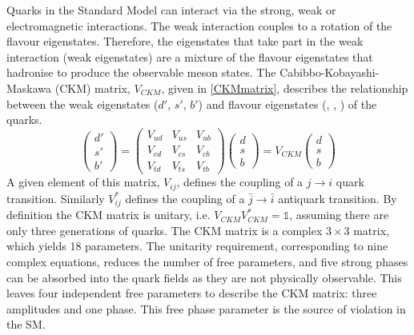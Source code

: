 Quarks in the Standard Model can interact via the strong, weak or electromagnetic interactions. The weak interaction couples to a rotation of the flavour eigenstates.
Therefore, the eigenstates that take part in the weak interaction (weak eigenstates) are a mixture of the flavour eigenstates that hadronise to produce the observable meson states. The Cabibbo-Kobayashi-Maskawa (CKM) matrix, $V_{CKM}$, given in \eqn\ref{CKMmatrix}, describes the relationship between the weak eigenstates ($d'$, $s'$, $b'$) and flavour eigenstates (\dquark, \squark, \bquark) of the quarks. 
\begin{equation}
\left(
\begin{array}{c} d' \\ s' \\ b'  \end{array} \right) =
\begin{pmatrix} V_{ud} & V_{us} & V_{ub} \\ V_{cd} & V_{cs} & V_{cb} \\ V_{td} & V_{ts} & V_{tb} \end{pmatrix} \left( 
\begin{array}{c} d \\ s \\ b \end{array} \right) =
V_{CKM} \left( \begin{array}{c} d \\ s \\ b \end{array} \right)
\label{CKMmatrix}
\end{equation}
A given element of this matrix, $V_{ij}$, defines the coupling of a $j \to i$ quark transition. Similarly $V_{ij}^*$ defines the coupling of a $\bar{j} \to \bar{i}$ antiquark transition. By definition the CKM matrix is unitary, i.e. $V_{CKM}V_{CKM}^* = \mathds{1}$, assuming there are only three generations of quarks. The CKM matrix is a complex $3 \times 3$ matrix, which yields 18 parameters. The unitarity requirement, corresponding to nine complex equations, reduces the number of free parameters, and five strong phases can be absorbed into the quark fields as they are not physically observable. This leaves four independent free parameters to describe the CKM matrix: three amplitudes and one phase. This free phase parameter is the source of \CP violation in the SM. 

